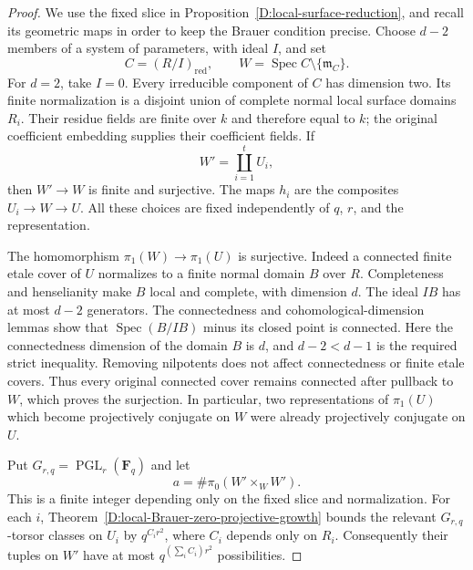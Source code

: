 \begin{proof}
We use the fixed slice in
Proposition~\ref{D:local-surface-reduction}, and recall its
geometric maps in order to keep the Brauer condition precise.
Choose $d-2$ members of a system of parameters, with ideal $I$,
and set
\[
       C=(R/I)_{\mathrm{red}},\qquad
       W=\operatorname{Spec}C\setminus\{\mathfrak m_C\}.
\]
For $d=2$, take $I=0$. Every irreducible component of $C$
has dimension two. Its finite normalization is a disjoint
union of complete normal local surface domains $R_i$.
Their residue fields are finite over $k$ and therefore equal
to $k$; the original coefficient embedding supplies their
coefficient fields. If
\[
            W'=\coprod_{i=1}^t U_i,
\]
then $W'\to W$ is finite and surjective. The maps $h_i$ are
the composites $U_i\to W\to U$. All these choices are fixed
independently of $q$, $r$, and the representation.

The homomorphism $\pi_1(W)\to\pi_1(U)$ is surjective.
Indeed a connected finite etale cover of $U$ normalizes to
a finite normal domain $B$ over $R$. Completeness and
henselianity make $B$ local and complete, with dimension $d$.
The ideal $IB$ has at most $d-2$ generators. The connectedness
and cohomological-dimension lemmas
\citep[Lemmas 52.14.1 and 51.4.3, Tags 0ECR and 0DX9]{C_StacksLocalSlice}
show that $\operatorname{Spec}(B/IB)$ minus its closed point
is connected. Here the connectedness dimension of the domain
$B$ is $d$, and $d-2<d-1$ is the required strict inequality.
Removing nilpotents does not affect connectedness or finite
etale covers. Thus every original connected cover remains
connected after pullback to $W$, which proves the surjection.
In particular, two representations of $\pi_1(U)$ which become
projectively conjugate on $W$ were already projectively
conjugate on $U$.

Put $G_{r,q}=\operatorname{PGL}_r(\mathbf F_q)$ and let
\[
                     a=\#\pi_0(W'\times_W W').
\]
This is a finite integer depending only on the fixed slice
and normalization. For each $i$, Theorem~\ref{D:local-Brauer-zero-projective-growth}
bounds the relevant $G_{r,q}$-torsor classes on $U_i$ by
$q^{C_i r^2}$, where $C_i$ depends only on $R_i$.
Consequently their tuples on $W'$ have at most
$q^{(\sum_i C_i)r^2}$ possibilities.


\end{proof}
